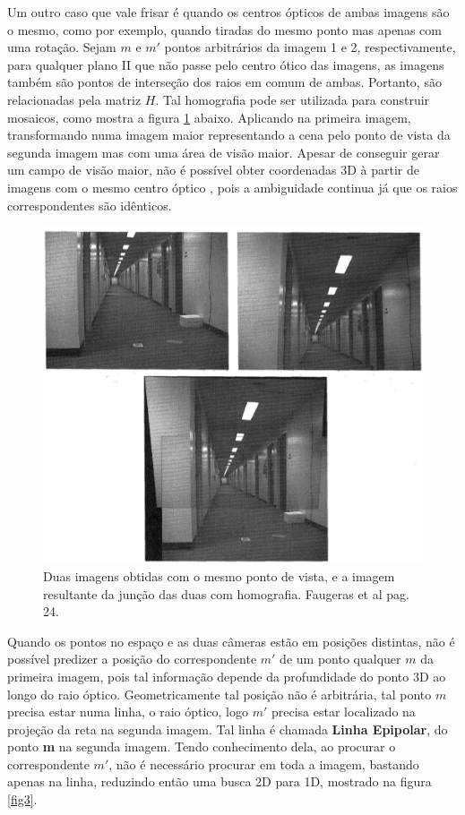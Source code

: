 Um outro caso que vale frisar é quando os centros ópticos de ambas imagens são o mesmo, como por exemplo, quando tiradas do mesmo ponto mas apenas com uma rotação. Sejam $m$ e $m'$ pontos arbitrários da imagem 1 e 2, respectivamente, para qualquer plano II que não passe pelo centro ótico das imagens, as imagens também são pontos de interseção dos raios em comum de ambas. Portanto, são relacionadas pela matriz $H$. Tal homografia pode ser utilizada para construir mosaicos, como mostra a figura \ref{fig2} abaixo. Aplicando na primeira imagem, transformando numa imagem maior representando a cena pelo ponto de vista da segunda imagem mas com uma área de visão maior. Apesar de conseguir gerar um campo de visão maior, não é possível obter coordenadas 3D à partir de imagens com o mesmo centro óptico \cite{Faugeras-Geometry}, pois a ambiguidade continua já que os raios correspondentes são idênticos.

\begin{figure}
	\centering
		\includegraphics[width=1.0\textwidth]{Imagens/figura2-2.png}
	\caption{Duas imagens obtidas com o mesmo ponto de vista, e a imagem resultante da junção das duas com homografia. Faugeras et al \cite{Faugeras-Geometry} pag. 24.}
	\label{fig2}
\end{figure}

Quando os pontos no espaço e as duas câmeras estão em posições distintas, não é possível predizer a posição do correspondente $m'$ de um ponto qualquer $m$ da primeira imagem, pois tal informação depende da profundidade do ponto 3D ao longo do raio óptico. Geometricamente tal posição não é arbitrária, tal ponto $m$ precisa estar numa linha, o raio óptico, logo $m'$ precisa estar localizado na projeção da reta na segunda imagem. Tal linha é chamada \textbf{Linha Epipolar}, do ponto \textbf{m} na segunda imagem. Tendo conhecimento dela, ao procurar o correspondente $m'$, não é necessário procurar em toda a imagem, bastando apenas na linha, reduzindo então uma busca 2D para 1D, mostrado na figura \ref{fig3}.

